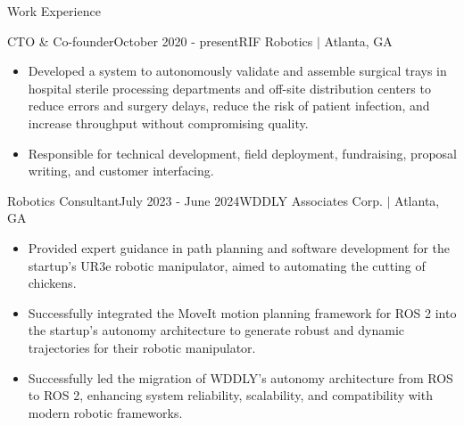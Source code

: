 \documentclass{resume} %
\newcommand{\sectionspace}{\vspace{3mm}}
\begin{document}
\sectionspace
\begin{rSection}{Work Experience}

\begin{rSubsection}{CTO \& Co-founder}{October 2020 - present}{RIF Robotics $\vert$ Atlanta, GA}{}

\item
\begin{itemize}
\item Developed a system to autonomously validate and assemble surgical trays
  in hospital sterile processing departments and off-site distribution centers
  to reduce errors and surgery delays, reduce the risk of patient infection,
  and increase throughput without compromising quality.

\item Responsible for technical development, field deployment, fundraising,
  proposal writing, and customer interfacing.
\end{itemize}

\end{rSubsection}


\begin{rSubsection}{Robotics Consultant}{July 2023 - June 2024}{WDDLY Associates Corp. $\vert$ Atlanta, GA}{}

\item
\begin{itemize}
\item Provided expert guidance in path planning and software development for
  the startup's UR3e robotic manipulator, aimed to automating the cutting of
  chickens.

\item Successfully integrated the MoveIt motion planning framework for ROS 2
  into the startup's autonomy architecture to generate robust and dynamic
  trajectories for their robotic manipulator.

\item Successfully led the migration of WDDLY's autonomy architecture from ROS
  to ROS 2, enhancing system reliability, scalability, and compatibility with
  modern robotic frameworks.

\end{itemize}

\end{rSubsection}



\end{rSection}
\end{document}

